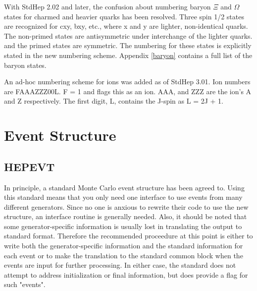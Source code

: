 With StdHep 2.02 and later, the confusion about numbering 
baryon $\Xi$ and $\Omega$ states for charmed
and heavier quarks has been resolved.  Three spin 1/2 states are recognized
for cxy, bxy, etc., where x and y are lighter, non-identical quarks.
The non-primed states are antisymmetric under interchange of the lighter quarks.
and the primed states are symmetric.  The numbering for these states is 
explicitly stated in the new numbering scheme.
Appendix \ref{baryon} contains a full list of the baryon states.

An ad-hoc numbering scheme for ions was added as of StdHep 3.01.  
Ion numbers are FAAAZZZ00L. F = 1 and flags this
as an ion.  AAA, and ZZZ are the ion's A and Z respectively.
The first digit, L, contains the J-spin as L = 2J + 1.

\section { Event Structure }
\subsection { HEPEVT }

In principle, a standard Monte Carlo event structure has been agreed to.
Using this standard means that you only need one interface to use events
from many different generators.  Since no one is anxious to rewrite their
code to use the new structure, an interface routine is generally needed.
Also, it should be noted that some generator-specific information is usually
lost in translating the output to standard format.  Therefore the recommended
proceedure at this point is either to write both the generator-specific
information and the standard information for each event or to make
the translation to the standard common block when the events are input for
further processing.  In either case, the standard does not attempt to address
initialization or final information, but does provide a flag for such "events".

